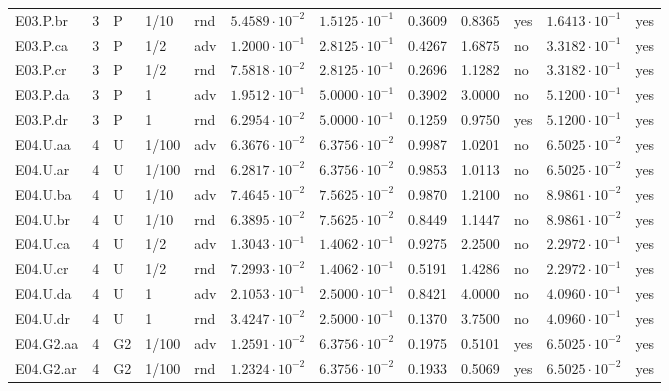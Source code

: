 {\begin{longtable}{@{}lllllllllll l@{}}
E03.P.br & 3 & P & 1/10 & rnd & $5.4589\cdot 10^{-2}$ & $1.5125\cdot 10^{-1}$ & 0.3609 & 0.8365 & yes & $1.6413\cdot 10^{-1}$ & yes \\
E03.P.ca & 3 & P & 1/2 & adv & $1.2000\cdot 10^{-1}$ & $2.8125\cdot 10^{-1}$ & 0.4267 & 1.6875 & no & $3.3182\cdot 10^{-1}$ & yes \\
E03.P.cr & 3 & P & 1/2 & rnd & $7.5818\cdot 10^{-2}$ & $2.8125\cdot 10^{-1}$ & 0.2696 & 1.1282 & no & $3.3182\cdot 10^{-1}$ & yes \\
E03.P.da & 3 & P & 1 & adv & $1.9512\cdot 10^{-1}$ & $5.0000\cdot 10^{-1}$ & 0.3902 & 3.0000 & no & $5.1200\cdot 10^{-1}$ & yes \\
E03.P.dr & 3 & P & 1 & rnd & $6.2954\cdot 10^{-2}$ & $5.0000\cdot 10^{-1}$ & 0.1259 & 0.9750 & yes & $5.1200\cdot 10^{-1}$ & yes \\
E04.U.aa & 4 & U & 1/100 & adv & $6.3676\cdot 10^{-2}$ & $6.3756\cdot 10^{-2}$ & 0.9987 & 1.0201 & no & $6.5025\cdot 10^{-2}$ & yes \\
E04.U.ar & 4 & U & 1/100 & rnd & $6.2817\cdot 10^{-2}$ & $6.3756\cdot 10^{-2}$ & 0.9853 & 1.0113 & no & $6.5025\cdot 10^{-2}$ & yes \\
E04.U.ba & 4 & U & 1/10 & adv & $7.4645\cdot 10^{-2}$ & $7.5625\cdot 10^{-2}$ & 0.9870 & 1.2100 & no & $8.9861\cdot 10^{-2}$ & yes \\
E04.U.br & 4 & U & 1/10 & rnd & $6.3895\cdot 10^{-2}$ & $7.5625\cdot 10^{-2}$ & 0.8449 & 1.1447 & no & $8.9861\cdot 10^{-2}$ & yes \\
E04.U.ca & 4 & U & 1/2 & adv & $1.3043\cdot 10^{-1}$ & $1.4062\cdot 10^{-1}$ & 0.9275 & 2.2500 & no & $2.2972\cdot 10^{-1}$ & yes \\
E04.U.cr & 4 & U & 1/2 & rnd & $7.2993\cdot 10^{-2}$ & $1.4062\cdot 10^{-1}$ & 0.5191 & 1.4286 & no & $2.2972\cdot 10^{-1}$ & yes \\
E04.U.da & 4 & U & 1 & adv & $2.1053\cdot 10^{-1}$ & $2.5000\cdot 10^{-1}$ & 0.8421 & 4.0000 & no & $4.0960\cdot 10^{-1}$ & yes \\
E04.U.dr & 4 & U & 1 & rnd & $3.4247\cdot 10^{-2}$ & $2.5000\cdot 10^{-1}$ & 0.1370 & 3.7500 & no & $4.0960\cdot 10^{-1}$ & yes \\
E04.G2.aa & 4 & G2 & 1/100 & adv & $1.2591\cdot 10^{-2}$ & $6.3756\cdot 10^{-2}$ & 0.1975 & 0.5101 & yes & $6.5025\cdot 10^{-2}$ & yes \\
E04.G2.ar & 4 & G2 & 1/100 & rnd & $1.2324\cdot 10^{-2}$ & $6.3756\cdot 10^{-2}$ & 0.1933 & 0.5069 & yes & $6.5025\cdot 10^{-2}$ & yes \\

\end{longtable}}
